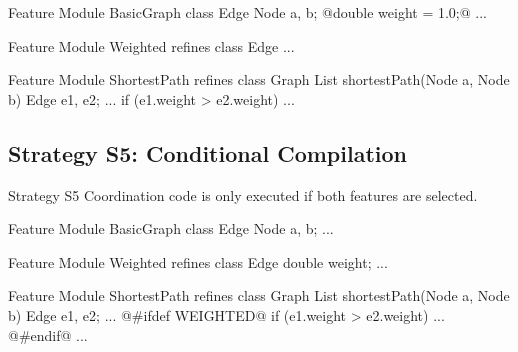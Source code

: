 \begin{frame}[fragile]{\myframetitle}
	\begin{fancycolumns}[animation=none]
\begin{codetight}{Feature Module BasicGraph}
class Edge {
	Node a, b;
	@double weight = 1.0;@
	...
}
\end{codetight}	
\begin{codetight}{Feature Module Weighted}
refines class Edge {
	...
}
\end{codetight}	
	\nextcolumn
\begin{codetight}{Feature Module ShortestPath}
refines class Graph {
	List shortestPath(Node a, Node b){
		Edge e1, e2;
		...
		if (e1.weight > e2.weight) 
		... 
	}
}
\end{codetight}	
	\end{fancycolumns}
\end{frame}

\subsection{Strategy S5: Conditional Compilation}

\begin{frame}{\myframetitle}
	\begin{fancycolumns}[widths={30},animation=none]
		\begin{definition}{Strategy S5}
			Coordination code is only executed if both features are selected.
		\end{definition}
	\nextcolumn
	\end{fancycolumns}
\end{frame}

\begin{frame}[fragile]{\myframetitle}
	\begin{fancycolumns}[animation=none]
\begin{codetight}{Feature Module BasicGraph}
class Edge {
	Node a, b; ...
}
\end{codetight}	
\begin{codetight}{Feature Module Weighted}
refines class Edge {
	double weight; ...
}
\end{codetight}	
	\nextcolumn
\begin{codetight}{Feature Module ShortestPath}
refines class Graph {
	List shortestPath(Node a, Node b){
		Edge e1, e2;
		...
@#ifdef WEIGHTED@		
		if (e1.weight > e2.weight) ...
@#endif@
		... 
	}
}
\end{codetight}	
	\end{fancycolumns}
\end{frame}

